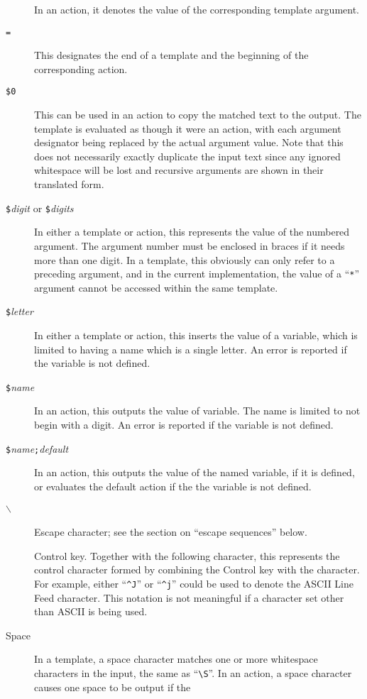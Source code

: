\begin{description}
In an action, it denotes the value of the corresponding template argument.
\item[{\tt =}]
This designates the end of a template and the beginning of the
corresponding action.
\item[{\tt \$0}]
This can be used in an action to copy the matched text to the output.
The template is evaluated as though it were an action, with each
argument designator being replaced by the actual argument value.
Note that this does not necessarily exactly duplicate the input text
since any ignored whitespace will be lost and recursive arguments are shown in
their translated form.
\item[{\tt \$}{\it digit} or {\tt \$\ttlb}{\it digits}{\tt \ttrb}]
In either a template or action, this represents the value of the
numbered argument.  The argument number must be enclosed in braces if it
needs more than one digit.  In a template, this obviously can only refer
to a preceding argument, and in the current implementation, the value of a
``\verb/*/'' argument cannot be accessed within the same template.
\item[{\tt \$}{\it letter}]
In either a template or action, this inserts the value of a variable,
which is limited to having a name which is a single letter.
An error is reported if the variable is not defined.
\item[{\tt \$\ttlb }{\it name}{\tt \ttrb }]
In an action, this outputs the value of variable.  The name is limited
to not begin with a digit.  An error is reported if the variable is not
defined.
\item[{\tt \$\ttlb }{\it name}{\tt ;}{\it default}{\tt \ttrb }]
In an action, this outputs the value of the named variable, if it is
defined, or evaluates the default action if the the variable is not defined.
\item[{\tt $\backslash$ }]
Escape character; see the section on ``escape sequences'' below.
\item[\tt \ttcaret]
Control key.  Together with the following character, this represents the
control character formed by combining the Control key with the character.
For example, either ``\verb/^J/'' or ``\verb/^j/'' could be used to
denote the ASCII Line Feed character.  This notation is not meaningful if a
character set other than ASCII is being used.
\item[Space]
In a template, a space character matches one or more whitespace
characters in the input, the same as ``\verb|\S|''.
In an action, a space character causes one space to be output if the

\end{description}
